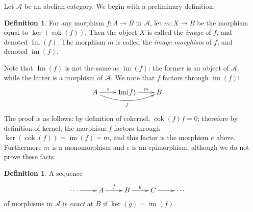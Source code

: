 \documentclass[12pt]{article}
\newcommand{\A}{\mathcal{A}}
\renewcommand{\Im}{\operatorname{Im}}
\newcommand{\im}{\operatorname{im}}
\newcommand{\cok}{\operatorname{cok}}
\theoremstyle{definition}
\newtheorem{definition}[theorem]{Definition}
\begin{document}
Let $\A$ be an abelian category. We begin with a preliminary definition.

\begin{definition}
For any morphism $f: A \longrightarrow B$ in $\A$, let $m: X \longrightarrow B$ be the morphism equal to $\ker(\cok(f))$. Then the object $X$ is called the {\em image} of $f$, and denoted $\Im(f)$. The morphism $m$ is called the {\em image morphism} of $f$, and denoted $\im(f)$.
\end{definition}

Note that $\Im(f)$ is not the same as $\im(f)$: the former is an object of $\A$, while the latter is a morphism of $\A$. We note that $f$ factors through $\im(f)$:
$$
\xymatrix{
A \ar[r]^-{e} \ar@/_1pc/[rr]_{f} & \Im(f) \ar[r]^-{m} & B
}
$$
The proof is as follows: by definition of cokernel, $\cok(f) f = 0$; therefore by definition of kernel, the morphism $f$ factors through $\ker(\cok(f)) = \im(f) = m$, and this factor is the morphism $e$ above. Furthermore $m$ is a monomorphism and $e$ is an epimorphism, although we do not prove these facts.

\begin{definition}
A sequence
$$
\xymatrix{
\cdots \ar[r] & A \ar[r]^-f & B \ar[r]^-g & C \ar[r] & \cdots
}
$$
of morphisms in $\A$ is {\em exact} at $B$ if $\ker(g) = \im(f)$.
\end{definition}
\end{document}
